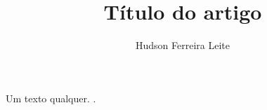 \documentclass[12pt,a4paper]{article}
\title{Título do artigo}
\author{Hudson Ferreira Leite}
\begin{document}
\maketitle

Um texto qualquer. \cite{freeman2009}.


\end{document}
